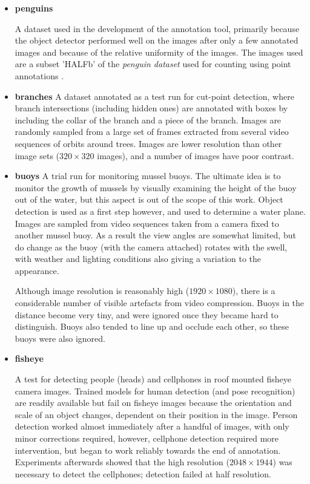 \begin{itemize}
    \item{\bf{penguins}}\par
A dataset used in the development of the annotation tool, primarily because the object detector performed well on the images after only a few annotated images and because of the relative uniformity of the images. The images used are a subset 'HALFb'  of the \emph{penguin dataset} \cite{PenguinData} used for counting using point annotations \cite{Arteta2016}. 
    \item{\bf{branches}}
A dataset annotated as a test run for cut-point detection, where branch intersections (including hidden ones) are annotated with boxes by including the collar of the branch and a piece of the branch. Images are randomly sampled from a large set of frames extracted from several video sequences of orbits around trees. Images are lower resolution than other image sets ($ 320\times320 $ images), and a number of images have poor contrast.

    \item{\bf{buoys}}
A trial run for monitoring mussel buoys. The ultimate idea is to monitor the growth of mussels by visually examining the height of the buoy out of the water, but this aspect is out of the scope of this work. Object detection is used as a first step however, and used to determine a water plane. Images are sampled from video sequences taken from a camera fixed to another mussel buoy. As a result the view angles are somewhat limited, but do change as the buoy (with the camera attached) rotates with the swell, with weather and lighting conditions also giving a variation to the appearance. 

Although image resolution is reasonably high ($1920\times1080$), there is a considerable number of visible artefacts from video compression. Buoys in the distance become very tiny, and were ignored once they became hard to distinguish. Buoys also tended to line up and occlude each other, so these buoys were also ignored.


    \item{\bf{fisheye}}
    
A test for detecting people (heads) and cellphones in roof mounted fisheye camera images. Trained models for human detection (and pose recognition) are readily available but fail on fisheye images because the orientation and scale of an object changes, dependent on their position in the image. Person detection worked almost immediately after a handful of images, with only minor corrections required, however, cellphone detection required more intervention, but began to work reliably towards the end of annotation. Experiments afterwards showed that the high resolution ($2048\times1944$) was necessary to detect the cellphones; detection failed at half resolution.


\end{itemize}
